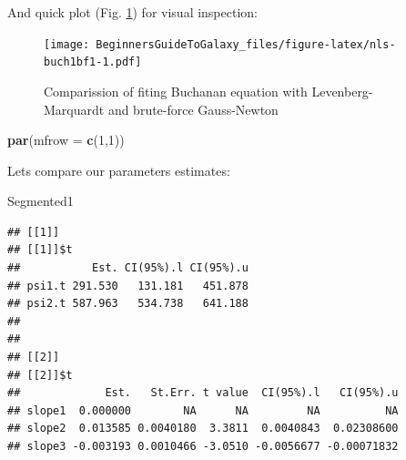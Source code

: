 \documentclass[]{book}
\newenvironment{Shaded}{\begin{snugshade}}{\end{snugshade}}
\newcommand{\KeywordTok}[1]{\textcolor[rgb]{0.13,0.29,0.53}{\textbf{#1}}}
\newcommand{\DataTypeTok}[1]{\textcolor[rgb]{0.13,0.29,0.53}{#1}}
\newcommand{\DecValTok}[1]{\textcolor[rgb]{0.00,0.00,0.81}{#1}}
\newcommand{\OperatorTok}[1]{\textcolor[rgb]{0.81,0.36,0.00}{\textbf{#1}}}
\newcommand{\NormalTok}[1]{#1}
\theoremstyle{definition}
\theoremstyle{definition}
\theoremstyle{definition}
\theoremstyle{remark}
\begin{document}
And quick plot (Fig. \ref{fig:nls-buch1bf1}) for visual inspection:

\begin{Shaded}
\end{Shaded}

\begin{figure}
\centering
\texttt{[image: BeginnersGuideToGalaxy\_files/figure-latex/nls-buch1bf1-1.pdf]}
\caption{\label{fig:nls-buch1bf1}Comparission of fiting Buchanan equation
with Levenberg-Marquardt and brute-force Gauss-Newton}
\end{figure}

\begin{Shaded}
\begin{Highlighting}[]
\KeywordTok{par}\NormalTok{(}\DataTypeTok{mfrow =} \KeywordTok{c}\NormalTok{(}\DecValTok{1}\NormalTok{,}\DecValTok{1}\NormalTok{))}
\end{Highlighting}
\end{Shaded}

Lets compare our parameters estimates:

\begin{Shaded}
\begin{Highlighting}[]
\NormalTok{Segmented1}
\end{Highlighting}
\end{Shaded}

\begin{verbatim}
## [[1]]
## [[1]]$t
##           Est. CI(95%).l CI(95%).u
## psi1.t 291.530   131.181   451.878
## psi2.t 587.963   534.738   641.188
## 
## 
## [[2]]
## [[2]]$t
##             Est.   St.Err. t value  CI(95%).l   CI(95%).u
## slope1  0.000000        NA      NA         NA          NA
## slope2  0.013585 0.0040180  3.3811  0.0040843  0.02308600
## slope3 -0.003193 0.0010466 -3.0510 -0.0056677 -0.00071832
\end{verbatim}
\end{document}
